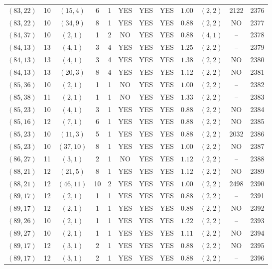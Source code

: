 \begin{longtable}{|c|c|c|c|c|c|c|c|c|c|c|c|}
$(83,22)$ & 10 & $(15,4)$ & 6 & 1 & YES & YES & YES & $1.00$ & $(2,2)$ & 2122 & 2376\\
$(83,22)$ & 10 & $(34,9)$ & 8 & 1 & YES & YES & YES & $0.88$ & $(2,2)$ & NO & 2377\\
$(84,37)$ & 10 & $(2,1)$ & 1 & 2 & NO & YES & YES & $0.88$ & $(4,1)$ & -- & 2378\\
$(84,13)$ & 13 & $(4,1)$ & 3 & 4 & YES & YES & YES & $1.25$ & $(2,2)$ & -- & 2379\\
$(84,13)$ & 13 & $(4,1)$ & 3 & 4 & YES & YES & YES & $1.38$ & $(2,2)$ & NO & 2380\\
$(84,13)$ & 13 & $(20,3)$ & 8 & 4 & YES & YES & YES & $1.12$ & $(2,2)$ & NO & 2381\\
$(85,36)$ & 10 & $(2,1)$ & 1 & 1 & NO & YES & YES & $1.00$ & $(2,2)$ & -- & 2382\\
$(85,38)$ & 11 & $(2,1)$ & 1 & 1 & NO & YES & YES & $1.33$ & $(2,2)$ & -- & 2383\\
$(85,23)$ & 10 & $(4,1)$ & 3 & 1 & YES & YES & YES & $0.88$ & $(2,2)$ & NO & 2384\\
$(85,16)$ & 12 & $(7,1)$ & 6 & 1 & YES & YES & YES & $0.88$ & $(2,2)$ & NO & 2385\\
$(85,23)$ & 10 & $(11,3)$ & 5 & 1 & YES & YES & YES & $0.88$ & $(2,2)$ & 2032 & 2386\\
$(85,23)$ & 10 & $(37,10)$ & 8 & 1 & YES & YES & YES & $1.00$ & $(2,2)$ & NO & 2387\\
$(86,27)$ & 11 & $(3,1)$ & 2 & 1 & NO & YES & YES & $1.12$ & $(2,2)$ & -- & 2388\\
$(88,21)$ & 12 & $(21,5)$ & 8 & 1 & YES & YES & YES & $1.12$ & $(2,2)$ & NO & 2389\\
$(88,21)$ & 12 & $(46,11)$ & 10 & 2 & YES & YES & YES & $1.00$ & $(2,2)$ & 2498 & 2390\\
$(89,17)$ & 12 & $(2,1)$ & 1 & 1 & YES & YES & YES & $0.88$ & $(2,2)$ & -- & 2391\\
$(89,17)$ & 12 & $(2,1)$ & 1 & 1 & YES & YES & YES & $0.88$ & $(2,2)$ & NO & 2392\\
$(89,26)$ & 10 & $(2,1)$ & 1 & 1 & YES & YES & YES & $1.22$ & $(2,2)$ & -- & 2393\\
$(89,27)$ & 10 & $(2,1)$ & 1 & 1 & YES & YES & YES & $1.11$ & $(2,2)$ & NO & 2394\\
$(89,17)$ & 12 & $(3,1)$ & 2 & 1 & YES & YES & YES & $0.88$ & $(2,2)$ & NO & 2395\\
$(89,17)$ & 12 & $(3,1)$ & 2 & 1 & YES & YES & YES & $0.88$ & $(2,2)$ & -- & 2396\\

\end{longtable}
